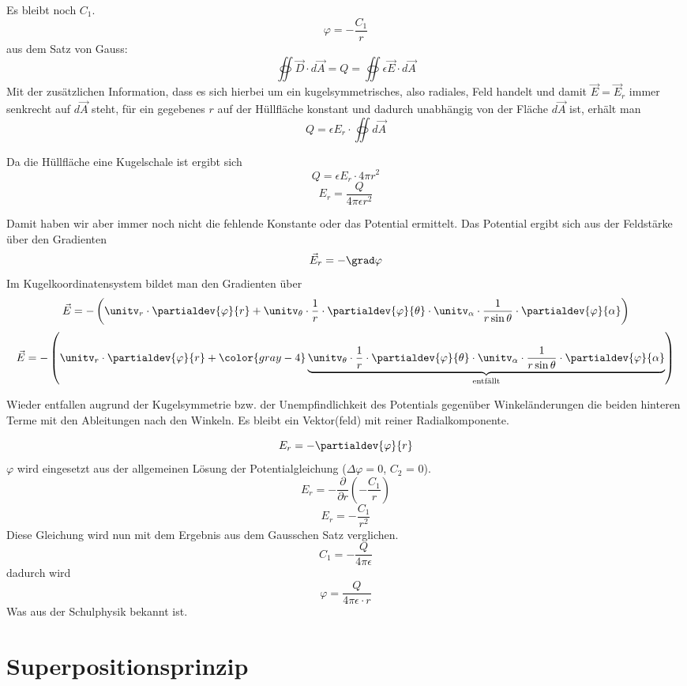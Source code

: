 \documentclass[11pt, a4paper]{article}
\begin{document}
Es bleibt noch $C_{1}$.
\[\varphi = -\frac{C_{1}}{r}\]
aus dem Satz von Gauss:
\[\oiint{\vec{D}\cdot d\vec{A}} = Q = \oiint{\epsilon\vec{E} \cdot d\vec{A}}\]
Mit der zusätzlichen Information, dass es sich hierbei um ein kugelsymmetrisches, also radiales, Feld handelt und damit $\vec{E} = \vec{E}_{r}$ immer senkrecht auf $d\vec{A}$ steht, für ein gegebenes $r$ auf der Hüllfläche konstant und dadurch unabhängig von der Fläche $d\vec{A}$ ist, erhält man
\[Q = \epsilon E_{r} \cdot \oiint{d\vec{A}}\]

Da die Hüllfläche eine Kugelschale ist ergibt sich
\[Q = \epsilon E_{r} \cdot 4 \pi r^{2}\]
\[\boxed{E_{r} = \frac{Q}{4 \pi \epsilon r^{2}}}\]

Damit haben wir aber immer noch nicht die fehlende Konstante oder das Potential ermittelt. Das Potential ergibt sich aus der Feldstärke über den Gradienten
\[\vec{E}_{r} = -\grad \varphi\]
Im Kugelkoordinatensystem bildet man den Gradienten über
\[\vec{E} = - \left( \unitv_{r} \cdot \partialdev{\varphi}{r} + \unitv_{\theta} \cdot \frac{1}{r} \cdot \partialdev{\varphi}{\theta} \cdot \unitv_{\alpha} \cdot \frac{1}{r \sin\theta} \cdot \partialdev{\varphi}{\alpha}\right )\]
\[\vec{E} = - \left( \unitv_{r} \cdot \partialdev{\varphi}{r} + \color{gray-4}\underbrace{\unitv_{\theta} \cdot \frac{1}{r} \cdot \partialdev{\varphi}{\theta} \cdot \unitv_{\alpha} \cdot \frac{1}{r \sin\theta} \cdot \partialdev{\varphi}{\alpha}}_{\text{entfällt}}\right )\]

Wieder entfallen augrund der Kugelsymmetrie bzw. der Unempfindlichkeit des Potentials gegenüber Winkeländerungen die beiden hinteren Terme mit den Ableitungen nach den Winkeln. Es bleibt ein Vektor(feld) mit reiner Radialkomponente.

\[E_{r} = - \partialdev{\varphi}{r}\]
$\varphi$ wird eingesetzt aus der allgemeinen Lösung der Potentialgleichung ($\Delta \varphi = 0$, $C_{2}$ = 0).
\[E_{r} = - \frac{\partial}{\partial r}\left(-\frac{C_{1}}{r}\right)\]
\[E_{r} = -\frac{C_{1}}{r^{2}}\]
Diese Gleichung wird nun mit dem Ergebnis aus dem Gausschen Satz verglichen.
\[C_{1} = -\frac{Q}{4\pi\epsilon}\]
dadurch wird
\[\boxed{\varphi = \frac{Q}{4 \pi \epsilon \cdot r}}\]
Was aus der Schulphysik bekannt ist.

\section{Superpositionsprinzip}

\begin{figure}[H]
\centering
{}
\end{figure}
\end{document}
